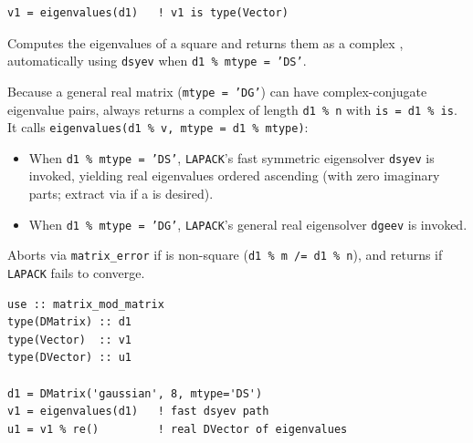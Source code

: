 \lstset{language=[95]Fortran}
\begin{lstlisting}
v1 = eigenvalues(d1)   ! v1 is type(Vector)
\end{lstlisting}

Computes the eigenvalues of a square  and returns them as a complex , automatically using \texttt{dsyev} when \texttt{d1 \% mtype = 'DS'}.

Because a general real matrix (\texttt{mtype = 'DG'}) can have complex-conjugate eigenvalue pairs,  always returns a complex  of length \texttt{d1 \% n} with \texttt{is = d1 \% is}. It calls \texttt{eigenvalues(d1 \% v, mtype = d1 \% mtype)}:
\begin{itemize}
  \item When \texttt{d1 \% mtype = 'DS'}, \texttt{LAPACK}'s fast symmetric eigensolver \texttt{dsyev} is invoked, yielding real eigenvalues ordered ascending (with zero imaginary parts; extract via  if a  is desired).
  \item When \texttt{d1 \% mtype = 'DG'}, \texttt{LAPACK}'s general real eigensolver \texttt{dgeev} is invoked.
\end{itemize}
Aborts via \texttt{matrix\_error} if  is non-square (\texttt{d1 \% m /= d1 \% n}), and returns  if \texttt{LAPACK} fails to converge.

\begin{description}[leftmargin=2.2cm, style=nextline]
\end{description}

\lstset{language=[95]Fortran}
\begin{lstlisting}
use :: matrix_mod_matrix
type(DMatrix) :: d1
type(Vector)  :: v1
type(DVector) :: u1

d1 = DMatrix('gaussian', 8, mtype='DS')
v1 = eigenvalues(d1)   ! fast dsyev path
u1 = v1 % re()         ! real DVector of eigenvalues
\end{lstlisting}


